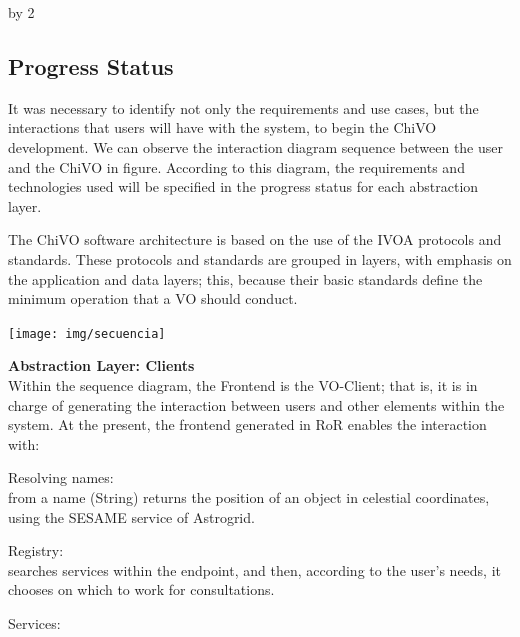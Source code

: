 \documentclass[11pt]{scrartcl}
\def\anzspalten{2}
\newlength{\kastenwidth}
\newenvironment{kasten}{
  \begin{lrbox}{\dummybox}
    \begin{minipage}{\linewidth}}
    {\end{minipage}
  \end{lrbox}
  \raisebox{-\depth}{\psshadowbox[cornersize=absolute,linearc=14pt,framesep=1em]{\usebox{\dummybox}}}\\[0.5em]}
\newenvironment{spalte}{
  \setlength\kastenwidth{1.2\textwidth}
  \divide\kastenwidth by \anzspalten
  \begin{minipage}[t]{\kastenwidth}}{\end{minipage}}
\begin{document}
\begin{lrbox}{\spalten}
{\begin{spalte}
      \begin{kasten}
        \section*{\hspace{0.2cm} {\color{red} Progress Status} }
	\begin{minipage}[t]{1.0\linewidth}
		It was necessary to identify not only the requirements and use cases, but the
		interactions that users will have with the system, to begin the ChiVO
		development.  We can observe the interaction diagram sequence between the user
		and the ChiVO in figure.  According to this diagram, the
		requirements and technologies used will be specified in the progress status for
		each abstraction layer.

		The ChiVO software architecture is based on the use of the IVOA
		protocols and standards.  These protocols and standards are grouped in layers,
		with emphasis on the application and data layers; this, because their basic
		standards define the minimum operation that a VO should conduct.\vspace{0.3cm}
	\end{minipage}
	\begin{minipage}[t]{1.0\linewidth}
		\begin{center}
		\texttt{[image: img/secuencia]}
		\end{center}
	\end{minipage}
	\begin{minipage}[t]{0.5\linewidth}
\textbf{Abstraction Layer:  Clients}\\\vspace{0.2cm}
Within the sequence diagram, the Frontend is the VO-Client; that is, it is in
charge of generating the interaction between users and other elements within
the system.
At the present, the frontend generated in RoR enables the interaction with:
\begin{description}
    \item Resolving names:\hfill \\
        from a name (String) returns the position of an object in celestial
        coordinates, using the SESAME service of Astrogrid.
    \item Registry: \hfill \\
        searches services within the endpoint, and then, according to the
        user's needs, it chooses on which to work for consultations.
    \item Services: \hfill \\

\end{description}
\end{minipage}
\end{kasten}
\end{spalte}}
\end{lrbox}
\end{document}
